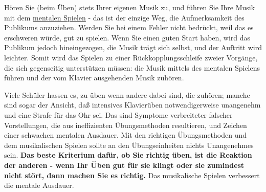Hören Sie (beim Üben) stets Ihrer eigenen Musik zu, und führen Sie Ihre Musik mit dem \hyperref[c1ii12mental]{mentalen Spielen} - das ist der einzige Weg, die Aufmerksamkeit des Publikums anzuziehen.
Werden Sie bei einem Fehler nicht bedrückt, weil das es erschweren würde, gut zu spielen.
Wenn Sie einen guten Start haben, wird das Publikum jedoch hineingezogen, die Musik trägt sich selbst, und der Auftritt wird leichter.
Somit wird das Spielen zu einer Rückkopplungsschleife zweier Vorgänge, die sich gegenseitig unterstützen müssen: die Musik mittels des mentalen Spielens führen und der vom Klavier ausgehenden Musik zuhören.

Viele Schüler hassen es, zu üben wenn andere dabei sind, die zuhören; manche sind sogar der Ansicht, daß intensives Klavierüben notwendigerweise unangenehm und eine Strafe für das Ohr sei.
Das sind Symptome verbreiteter falscher Vorstellungen, die aus ineffizienten Übungsmethoden resultieren, und Zeichen einer schwachen mentalen Ausdauer.
Mit den richtigen Übungsmethoden und dem musikalischen Spielen sollte an den Übungseinheiten nichts Unangenehmes sein.
\textbf{Das beste Kriterium dafür, ob Sie richtig üben, ist die Reaktion der anderen - wenn Ihr Üben gut für sie klingt oder sie zumindest nicht stört, dann machen Sie es richtig.}
Das musikalische Spielen verbessert die mentale Ausdauer.



